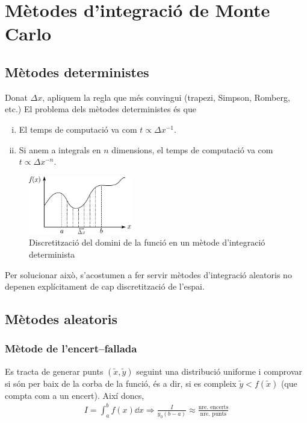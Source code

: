 \section{Mètodes d'integració de Monte Carlo}
\subsection{Mètodes deterministes}
Donat $\Delta x$, apliquem la regla que més convingui (trapezi, Simpson, Romberg, etc.) El problema dels mètodes deterministes és que
\begin{enumerate}[(i)]
	\item El temps de computació va com $t \propto \Delta x^{-1}$.
	\item Si anem a integrals en $n$ dimensions, el temps de computació va com $t \propto \Delta x^{-n}$.
\end{enumerate}

\begin{figure}[H]
	\centering
	\includegraphics[width=0.4\textwidth]{./images/determinista}
	\caption{Discretització del domini de la funció en un mètode d'integració determinista}
	\label{fig:determinista}
\end{figure}

Per solucionar això, s'acostumen a fer servir mètodes d'integració aleatoris no depenen explícitament de cap discretització de l'espai.

\subsection{Mètodes aleatoris}
\subsubsection*{Mètode de l'encert--fallada}
Es tracta de generar punts $(\tilde{x},\tilde{y})$ seguint una distribució uniforme i comprovar si són per baix de la corba de la funció, és a dir, si es compleix $\tilde{y} < f(\tilde{x})$ (que compta com a un encert). Així doncs,
\begin{align}
	I = \int_{a}^{b} f(x) \dd{x} \Rightarrow \frac{I}{y_{0}(b-a)} \approx \frac{\text{nre. encerts}}{\text{nre. punts}}
\end{align}

